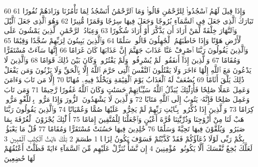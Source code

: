 {\tiny\colorbox{cl_aya}{60}} وَإِذَا قِيلَ لَهُمُ ٱسْجُدُوا۟ لِلرَّحْمَٰنِ قَالُوا۟ وَمَا ٱلرَّحْمَٰنُ أَنَسْجُدُ لِمَا تَأْمُرُنَا وَزَادَهُمْ نُفُورًا
{\tiny\colorbox{cl_aya}{61}} تَبَارَكَ ٱلَّذِى جَعَلَ فِى ٱلسَّمَآءِ بُرُوجًا وَجَعَلَ فِيهَا سِرَٰجًا وَقَمَرًا مُّنِيرًا
{\tiny\colorbox{cl_aya}{62}} وَهُوَ ٱلَّذِى جَعَلَ ٱلَّيْلَ وَٱلنَّهَارَ خِلْفَةً لِّمَنْ أَرَادَ أَن يَذَّكَّرَ أَوْ أَرَادَ شُكُورًا
{\tiny\colorbox{cl_aya}{63}} وَعِبَادُ ٱلرَّحْمَٰنِ ٱلَّذِينَ يَمْشُونَ عَلَى ٱلْأَرْضِ هَوْنًا وَإِذَا خَاطَبَهُمُ ٱلْجَٰهِلُونَ قَالُوا۟ سَلَٰمًا
{\tiny\colorbox{cl_aya}{64}} وَٱلَّذِينَ يَبِيتُونَ لِرَبِّهِمْ سُجَّدًا وَقِيَٰمًا
{\tiny\colorbox{cl_aya}{65}} وَٱلَّذِينَ يَقُولُونَ رَبَّنَا ٱصْرِفْ عَنَّا عَذَابَ جَهَنَّمَ إِنَّ عَذَابَهَا كَانَ غَرَامًا
{\tiny\colorbox{cl_aya}{66}} إِنَّهَا سَآءَتْ مُسْتَقَرًّا وَمُقَامًا
{\tiny\colorbox{cl_aya}{67}} وَٱلَّذِينَ إِذَآ أَنفَقُوا۟ لَمْ يُسْرِفُوا۟ وَلَمْ يَقْتُرُوا۟ وَكَانَ بَيْنَ ذَٰلِكَ قَوَامًا
{\tiny\colorbox{cl_aya}{68}} وَٱلَّذِينَ لَا يَدْعُونَ مَعَ ٱللَّهِ إِلَٰهًا ءَاخَرَ وَلَا يَقْتُلُونَ ٱلنَّفْسَ ٱلَّتِى حَرَّمَ ٱللَّهُ إِلَّا بِٱلْحَقِّ وَلَا يَزْنُونَ وَمَن يَفْعَلْ ذَٰلِكَ يَلْقَ أَثَامًا
{\tiny\colorbox{cl_aya}{69}} يُضَٰعَفْ لَهُ ٱلْعَذَابُ يَوْمَ ٱلْقِيَٰمَةِ وَيَخْلُدْ فِيهِۦ مُهَانًا
{\tiny\colorbox{cl_aya}{70}} إِلَّا مَن تَابَ وَءَامَنَ وَعَمِلَ عَمَلًا صَٰلِحًا فَأُو۟لَٰٓئِكَ يُبَدِّلُ ٱللَّهُ سَيِّـَٔاتِهِمْ حَسَنَٰتٍ وَكَانَ ٱللَّهُ غَفُورًا رَّحِيمًا
{\tiny\colorbox{cl_aya}{71}} وَمَن تَابَ وَعَمِلَ صَٰلِحًا فَإِنَّهُۥ يَتُوبُ إِلَى ٱللَّهِ مَتَابًا
{\tiny\colorbox{cl_aya}{72}} وَٱلَّذِينَ لَا يَشْهَدُونَ ٱلزُّورَ وَإِذَا مَرُّوا۟ بِٱللَّغْوِ مَرُّوا۟ كِرَامًا
{\tiny\colorbox{cl_aya}{73}} وَٱلَّذِينَ إِذَا ذُكِّرُوا۟ بِـَٔايَٰتِ رَبِّهِمْ لَمْ يَخِرُّوا۟ عَلَيْهَا صُمًّا وَعُمْيَانًا
{\tiny\colorbox{cl_aya}{74}} وَٱلَّذِينَ يَقُولُونَ رَبَّنَا هَبْ لَنَا مِنْ أَزْوَٰجِنَا وَذُرِّيَّٰتِنَا قُرَّةَ أَعْيُنٍ وَٱجْعَلْنَا لِلْمُتَّقِينَ إِمَامًا
{\tiny\colorbox{cl_aya}{75}} أُو۟لَٰٓئِكَ يُجْزَوْنَ ٱلْغُرْفَةَ بِمَا صَبَرُوا۟ وَيُلَقَّوْنَ فِيهَا تَحِيَّةً وَسَلَٰمًا
{\tiny\colorbox{cl_aya}{76}} خَٰلِدِينَ فِيهَا حَسُنَتْ مُسْتَقَرًّا وَمُقَامًا
{\tiny\colorbox{cl_aya}{77}} قُلْ مَا يَعْبَؤُا۟ بِكُمْ رَبِّى لَوْلَا دُعَآؤُكُمْ فَقَدْ كَذَّبْتُمْ فَسَوْفَ يَكُونُ لِزَامًۢا
{\tiny\colorbox{cl_aya}{1}} طسٓمٓ
{\tiny\colorbox{cl_aya}{2}} تِلْكَ ءَايَٰتُ ٱلْكِتَٰبِ ٱلْمُبِينِ
{\tiny\colorbox{cl_aya}{3}} لَعَلَّكَ بَٰخِعٌ نَّفْسَكَ أَلَّا يَكُونُوا۟ مُؤْمِنِينَ
{\tiny\colorbox{cl_aya}{4}} إِن نَّشَأْ نُنَزِّلْ عَلَيْهِم مِّنَ ٱلسَّمَآءِ ءَايَةً فَظَلَّتْ أَعْنَٰقُهُمْ لَهَا خَٰضِعِينَ
